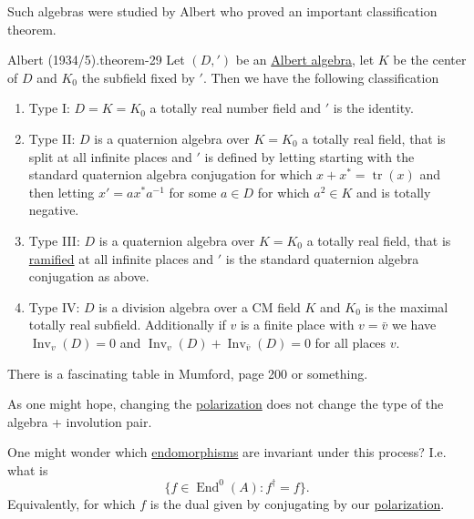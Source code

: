 \documentclass[10pt,]{book}
\numberwithin{equation}{section}
\DeclareMathOperator{\End}{End}
\DeclareMathOperator{\tr}{tr}
\begin{document}
\hypertarget{p-345}{}%
Such algebras were studied by Albert who proved an important classification theorem.%
\begin{theorem}{Albert (1934/5).}{}{theorem-29}%
\hypertarget{p-346}{}%
Let \((D, ')\) be an \hyperref[def-albert-alg]{Albert algebra}, let \(K\) be the center of \(D\) and \(K_0\) the subfield fixed by \('\). Then we have the following classification\leavevmode%
\begin{enumerate}
\item\hypertarget{li-56}{}Type I: \(D = K = K_0\) a totally real number field and \('\) is the identity.%
\item\hypertarget{li-57}{}Type II: \(D\) is a quaternion algebra over \(K = K_0\) a totally real field, that is split at all infinite places and \('\) is defined by letting starting with the standard quaternion algebra conjugation for which \(x + x^* = \tr(x)\) and then letting \(x' = ax^* a^{-1}\) for some \(a \in D\) for which \(a^2 \in K\) and is totally negative.%
\item\hypertarget{li-58}{}Type III: \(D\) is a quaternion algebra over \(K = K_0\) a totally real field, that is \hyperref[def-dess-ramified]{ramified} at all infinite places and \('\) is the standard quaternion algebra conjugation as above.%
\item\hypertarget{li-59}{}Type IV: \(D\) is a division algebra over a CM field \(K\) and \(K_0\) is the maximal totally real subfield. Additionally if \(v\) is a finite place with \(v = \bar v\) we have \(\operatorname{Inv}_v(D) = 0\) and \(\operatorname{Inv}_v(D) + \operatorname{Inv}_{\bar v}(D) = 0\) for all places \(v\).%
\end{enumerate}
%
\end{theorem}
\hypertarget{p-347}{}%
There is a fascinating table in Mumford, page 200 or something.%
\par
\hypertarget{p-348}{}%
As one might hope, changing the \hyperref[def-polarization]{polarization} does not change the type of the algebra + involution pair.%
\par
\hypertarget{p-349}{}%
One might wonder which \hyperref[def-supersing-isog-endo]{endomorphisms} are invariant under this process? I.e. what is%
\begin{equation*}
\{f \in \End^0(A) : f^\dagger = f\}\text{.}
\end{equation*}
Equivalently, for which \(f\) is the dual given by conjugating by our \hyperref[def-polarization]{polarization}.%
\par
\hypertarget{p-350}{}%
\end{document}
